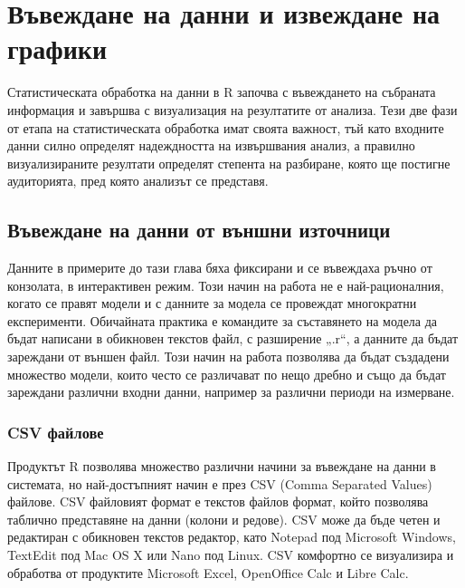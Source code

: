 \newpage
\chapter{Въвеждане на данни и извеждане на графики}
\label{chapter04}
\thispagestyle{empty}

Статистическата обработка на данни в R започва с въвеждането на събраната информация и завършва с визуализация на резултатите от анализа. Тези две фази от етапа на статистическата обработка имат своята важност, тъй като входните данни силно определят надеждността на извършвания анализ, а правилно визуализираните резултати определят степента на разбиране, която ще постигне аудиторията, пред която анализът се представя.

\section{Въвеждане на данни от външни източници}

Данните в примерите до тази глава бяха фиксирани и се въвеждаха ръчно от конзолата, в интерактивен режим. Този начин на работа не е най-рационалния, когато се правят модели и с данните за модела се провеждат многократни експерименти. Обичайната практика е командите за съставянето на модела да бъдат написани в обикновен текстов файл, с разширение „.r“, а данните да бъдат зареждани от външен файл. Този начин на работа позволява да бъдат създадени множество модели, които често се различават по нещо дребно и също да бъдат зареждани различни входни данни, например за различни периоди на измерване.

\subsection{CSV файлове}

Продуктът R позволява множество различни начини за въвеждане на данни в системата, но най-достъпният начин е през CSV (Comma Separated Values) файлове. CSV файловият формат е текстов файлов формат, който позволява таблично представяне на данни (колони и редове). CSV може да бъде четен и редактиран с обикновен текстов редактор, като Notepad под Microsoft Windows, TextEdit под Mac OS X или Nano под Linux. CSV комфортно се визуализира и обработва от продуктите Microsoft Excel, OpenOffice Calc и Libre Calc.

